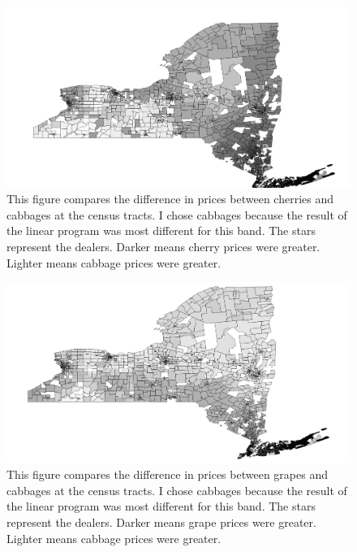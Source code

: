 \documentclass{report}
\begin{document}
\begin{figure}
\centering
\begin{framed}
\includegraphics[scale=.39]{stores_243_66}
\caption{This figure compares the difference in prices between cherries and cabbages at the census tracts. I chose cabbages because the result of the linear program was most different for this band. The stars represent the dealers. Darker means cherry prices were greater. Lighter means cabbage prices were greater.}
\label{fig:stores_243_66}
\end{framed}
\end{figure}

\begin{figure}
\centering
\begin{framed}
\includegraphics[scale=.39]{stores_243_69}
\caption{This figure compares the difference in prices between grapes and cabbages at the census tracts. I chose cabbages because the result of the linear program was most different for this band. The stars represent the dealers. Darker means grape prices were greater. Lighter means cabbage prices were greater.}
\label{fig:stores_243_69}
\end{framed}
\end{figure}
\end{document}
